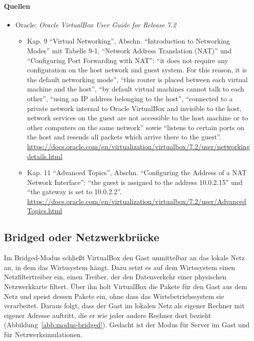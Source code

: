\paragraph{Quellen}
\begin{itemize}[quellen]
  \item Oracle: \emph{Oracle VirtualBox User Guide for Release 7.2}
  \begin{itemize}[nosep]
    \item Kap. 9 \enquote{Virtual Networking}, Abschn. \enquote{Introduction to Networking Modes} mit Tabelle 9-1, \enquote{Network Address Translation (NAT)} und \enquote{Configuring Port Forwarding with NAT}: \enquote{it does not require any configuration on the host network and guest system. For this reason, it is the default networking mode}, \enquote{this router is placed between each virtual machine and the host}, \enquote{by default virtual machines cannot talk to each other}, \enquote{using an IP address belonging to the host}, \enquote{connected to a private network internal to Oracle VirtualBox and invisible to the host, network services on the guest are not accessible to the host machine or to other computers on the same network} sowie \enquote{listens to certain ports on the host and resends all packets which arrive there to the guest}. \url{https://docs.oracle.com/en/virtualization/virtualbox/7.2/user/networkingdetails.html}
    \item Kap. 11 \enquote{Advanced Topics}, Abschn. \enquote{Configuring the Address of a NAT Network Interface}: \enquote{the guest is assigned to the address 10.0.2.15} und \enquote{the gateway is set to 10.0.2.2}. \url{https://docs.oracle.com/en/virtualization/virtualbox/7.2/user/AdvancedTopics.html}
  \end{itemize}
\end{itemize}

\subsection{Bridged oder Netzwerkbrücke}
\label{sec:modus-bridged}

Im Bridged-Modus schließt VirtualBox den Gast unmittelbar an das lokale Netz an, in dem das Wirtssystem hängt. Dazu setzt es auf dem Wirtssystem einen Netzfiltertreiber ein, einen Treiber, der den Datenverkehr einer physischen Netzwerkkarte filtert. Über ihn holt VirtualBox die Pakete für den Gast aus dem Netz und speist dessen Pakete ein, ohne dass das Wirtsbetriebssystem sie verarbeitet. Daraus folgt, dass der Gast im lokalen Netz als eigener Rechner mit eigener Adresse auftritt, die er wie jeder andere Rechner dort bezieht (Abbildung~\ref{abb:modus-bridged}). Gedacht ist der Modus für Server im Gast und für Netzwerksimulationen.

